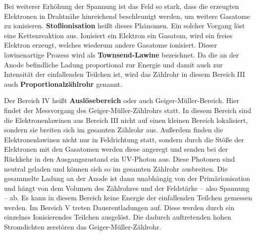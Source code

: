 Bei weiterer Erhöhung der Spannung ist das Feld so stark, dass die erzeugten Elektronen
in Drahtnähe hinreichend beschleunigt werden, um weitere Gasatome zu ionisieren.
\textbf{Stoßionisation} heißt dieses Phänomen.
Ein solcher Vorgang löst eine Kettenreaktion aus. Ionisiert ein Elektron ein Gasatom, 
wird ein freies Elektron erzeugt, welches wiederum andere Gasatome ionisiert.
Dieser lawinenartige Prozess wird als \textbf{Townsend-Lawine} bezeichnet.
Da die an der Anode befindliche Ladung proportional zur Energie und damit auch zur Intensität 
der einfallenden Teilchen ist, wird das Zählrohr in diesem Bereich III auch
\textbf{Proportionalzählrohr} genannt.

Der Bereich IV heißt \textbf{Auslösebereich} oder auch Geiger-Müller-Bereich. Hier findet 
der Messvorgang des Geiger-Müller-Zählrohrs statt.
In diesem Bereich sind die Elektronenlawinen aus Bereich III nicht auf einen kleinen Bereich
lokalisiert, sondern sie breiten sich im gesamten Zählrohr aus. Außerdem finden die
Elektronenlawinen nicht nur in Feldrichtung statt, sondern durch die Stöße der Elektronen mit 
den Gasatomen werden diese angeregt und senden bei der Rückkehr in den Ausgangszustand 
ein UV-Photon aus. Diese Photonen sind neutral geladen und können sich so im gesamten
Zählrohr ausbreiten.
Die gesammelte Ladung an der Anode ist dann unabhängig von der Primärionisation und hängt 
von dem Volumen des Zählrohres und der Feldstärke -- also Spannung -- ab.
Es kann in diesem Bereich keine Energie der einfallenden Teilchen gemessen werden.
Im Bereich V treten Dauerentladungen auf. Diese werden durch ein einzelnes Ionisierendes Teilchen
ausgelöst. Die dadurch auftretenden hohen Stromdichten zerstören das Geiger-Müller-Zählrohr.
\FloatBarrier
